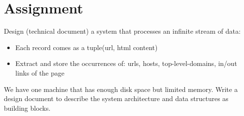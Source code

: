 \section{Assignment}

Design (technical document) a system that processes an infinite
stream of data:
\begin{itemize}
  \item Each record comes as a tuple(url, html content)
  \item Extract and store the occurrences of: urls, hosts, top-level-domains, in/out links of the page
\end{itemize}

We have one machine that has enough disk space but limited memory. Write a design document to describe the system architecture and data structures as building blocks.
